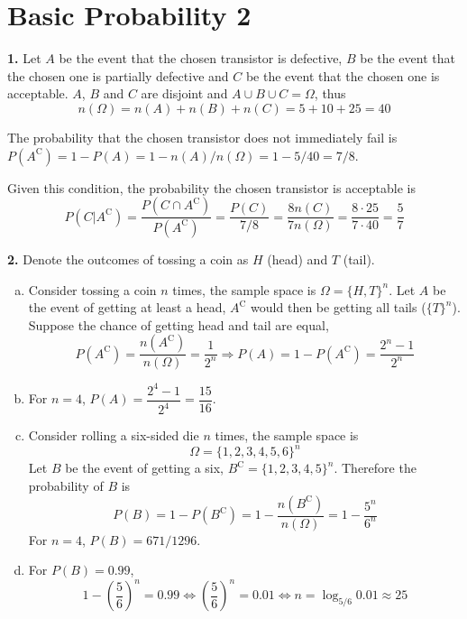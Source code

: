 \documentclass[a4paper,12pt]{article}
\newcommand{\C}{\mathrm C}
\newcommand{\exercise}[1]{\noindent\textbf{#1.}}
\begin{document}
\section{Basic Probability 2}
\exercise 1  Let $A$ be the event that the chosen transistor is defective,
$B$ be the event that the chosen one is partially defective
and $C$ be the event that the chosen one is acceptable.
$A$, $B$ and $C$ are disjoint and $A\cup B\cup C = \Omega$, thus
\[n(\Omega) = n(A) + n(B) + n(C) = 5 + 10 + 25 = 40\]

The probability that the chosen transistor does not immediately fail is
$P\left(A^\C\right) = 1 - P(A) = 1 - n(A)/n(\Omega) = 1 - 5/40 = 7/8$.

Given this condition, the probability the chosen transistor is acceptable is
\[P\left(C|A^\C\right) = \frac{P\left(C\cap A^\C\right)}{P\left(A^\C\right)}
= \frac{P(C)}{7/8}
= \frac{8n(C)}{7n(\Omega)} = \frac{8\cdot 25}{7\cdot 40} = \frac 5 7\]

\exercise 2  Denote the outcomes of tossing a coin as $H$ (head) and $T$ (tail).
\begin{enumerate}[(a)]
  \item Consider tossing a coin $n$ times, the sample space is
    $\Omega = \{H, T\}^n$.  Let $A$ be the event of getting at least a head,
    $A^\C$ would then be getting all tails ($\{T\}^n$).  Suppose the chance of getting
    head and tail are equal,
    \[P\left(A^\C\right) = \frac{n\left(A^\C\right)}{n(\Omega)} = \frac{1}{2^n}
    \Longrightarrow P(A) = 1 - P\left(A^\C\right) = \frac{2^n - 1}{2^n}\]
  \item For $n = 4$, $P(A) = \dfrac{2^4 - 1}{2^4} = \dfrac{15}{16}$.
  \item Consider rolling a six-sided die $n$ times, the sample space is
    \[\Omega = \{1, 2, 3, 4, 5, 6\}^n\]
    Let $B$ be the event of getting a six, $B^\C = \{1, 2, 3, 4, 5\}^n$.
    Therefore the probability of $B$ is
    \[P(B) = 1 - P\left(B^\C\right)
    = 1 - \frac{n\left(B^\C\right)}{n(\Omega)} = 1 - \frac{5^n}{6^n}\]
    For $n = 4$, $P(B) = 671/1296$.
  \item For $P(B) = 0.99$,
    \[1 - \left(\frac{5}{6}\right)^n = 0.99
    \iff \left(\frac{5}{6}\right)^n = 0.01
    \iff n = \log_{5/6}0.01 \approx 25\]
\end{enumerate}
\end{document}
